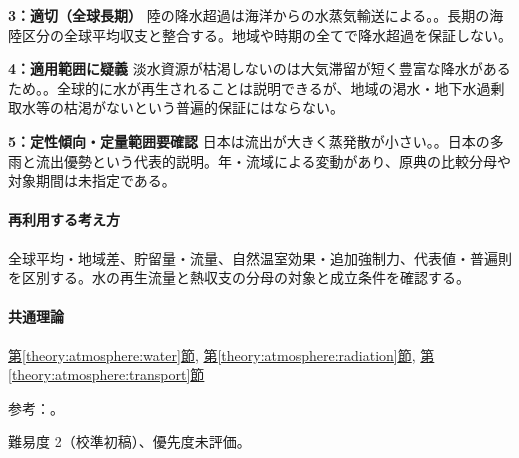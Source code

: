 \noindent\textbf{3：適切（全球長期）} 陸の降水超過は海洋からの水蒸気輸送による。。長期の海陸区分の全球平均収支と整合する。地域や時期の全てで降水超過を保証しない。\par

\noindent\textbf{4：適用範囲に疑義} 淡水資源が枯渇しないのは大気滞留が短く豊富な降水があるため。。全球的に水が再生されることは説明できるが、地域の渇水・地下水過剰取水等の枯渇がないという普遍的保証にはならない。\par

\noindent\textbf{5：定性傾向・定量範囲要確認} 日本は流出が大きく蒸発散が小さい。。日本の多雨と流出優勢という代表的説明。年・流域による変動があり、原典の比較分母や対象期間は未指定である。\par

\paragraph{再利用する考え方} 全球平均・地域差、貯留量・流量、自然温室効果・追加強制力、代表値・普遍則を区別する。水の再生流量と熱収支の分母の対象と成立条件を確認する。

\paragraph{共通理論} \hyperref[theory:atmosphere:water]{第\ref*{theory:atmosphere:water}節}, \hyperref[theory:atmosphere:radiation]{第\ref*{theory:atmosphere:radiation}節}, \hyperref[theory:atmosphere:transport]{第\ref*{theory:atmosphere:transport}節}

\par 参考：\cite{atm_nasa_budget,atm_usgs_cycle}。

\par 難易度 2（校準初稿）、優先度未評価。
